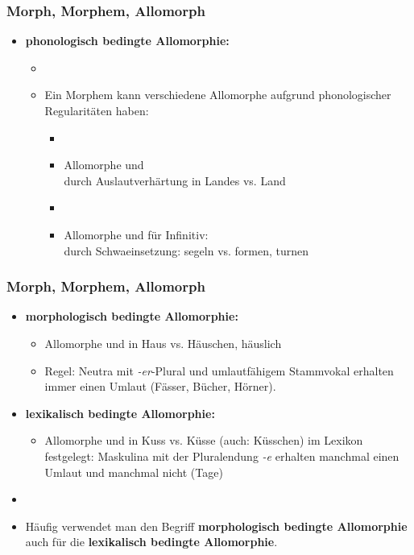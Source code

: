 \begin{frame}
\frametitle{Morph, Morphem, Allomorph}

\begin{itemize}
	\item \textbf{phonologisch bedingte Allomorphie:}
	
	\begin{itemize}
		\item[]
		\item Ein Morphem kann verschiedene Allomorphe aufgrund phonologischer Regularitäten haben:
		
		\begin{itemize}
			\item[]
			\item Allomorphe \textipa{[land]} und \textipa{[lant]} \\
			durch Auslautverhärtung in Landes vs. Land
			\item[]
			\item Allomorphe \textipa{[n]} und \textipa{[@n]} für Infinitiv: \\
			durch Schwaeinsetzung: segeln vs. formen, turnen
		\end{itemize}
	\end{itemize}
\end{itemize}


\end{frame}



\begin{frame}
\frametitle{Morph, Morphem, Allomorph}

\begin{itemize}
	\item \textbf{morphologisch bedingte Allomorphie:}
	
	\begin{itemize}
		\item Allomorphe \textipa{[haUs]} und \textipa{[hOIs]} in Haus vs. Häuschen, häuslich
		\item Regel: Neutra mit \emph{-er}-Plural und umlautfähigem Stammvokal erhalten immer einen Umlaut (Fässer, Bücher, Hörner).
	\end{itemize}
	
	\item \textbf{lexikalisch bedingte Allomorphie:}
	
	\begin{itemize}
		\item Allomorphe \textipa{[kUs]} und \textipa{[kYs]} in Kuss vs. Küsse (auch: Küsschen) im Lexikon festgelegt: Maskulina mit der Pluralendung \emph{-e} erhalten manchmal einen Umlaut und manchmal nicht (Tage)
	\end{itemize}
	
	\item[]
	\item Häufig verwendet man den Begriff \textbf{morphologisch bedingte Allomorphie} auch für die \textbf{lexikalisch bedingte Allomorphie}.
\end{itemize}


\end{frame}



